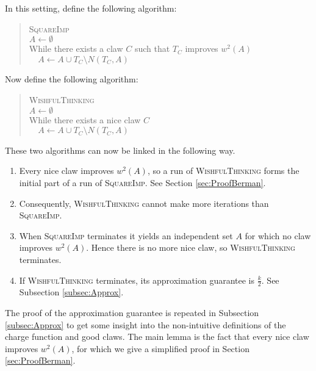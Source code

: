 In this setting, define the following algorithm:
%
\begin{quote}
\textsc{SquareImp} \\
$A \leftarrow \emptyset$ \\
While there exists a claw $C$ such that $T_C$ improves $w^2(A)$ \\
\verb"  " $A \leftarrow A \cup T_C \setminus N(T_C,A)$
\end{quote}
%
Now define the following algorithm:
%
\begin{quote}
\textsc{WishfulThinking} \\
$A \leftarrow \emptyset$ \\
While there exists a nice claw $C$ \\
\verb"  " $A \leftarrow A \cup T_C \setminus N(T_C,A)$
\end{quote}
%
These two algorithms can now be linked in the following way.
%
\begin{enumerate}
  \item Every nice claw improves $w^2(A)$, so a run of \textsc{WishfulThinking} forms the initial part of a run of \textsc{SquareImp}. See Section \ref{sec:ProofBerman}.
  \item Consequently, \textsc{WishfulThinking} cannot make more iterations than \textsc{SquareImp}.
  \item When \textsc{SquareImp} terminates it yields an independent set $A$ for which no claw improves $w^2(A)$. Hence there is no more nice claw, so \textsc{WishfulThinking} terminates.
  \item If \textsc{WishfulThinking} terminates, its approximation guarantee is $\frac{k}{2}$. See Subsection \ref{subsec:Approx}.
\end{enumerate}
%
The proof of the approximation guarantee is repeated in Subsection \ref{subsec:Approx} to get some insight into the non-intuitive definitions of the charge function and good claws. The main lemma is the fact that every nice claw improves $w^2(A)$, for which we give a simplified proof in Section \ref{sec:ProofBerman}.



